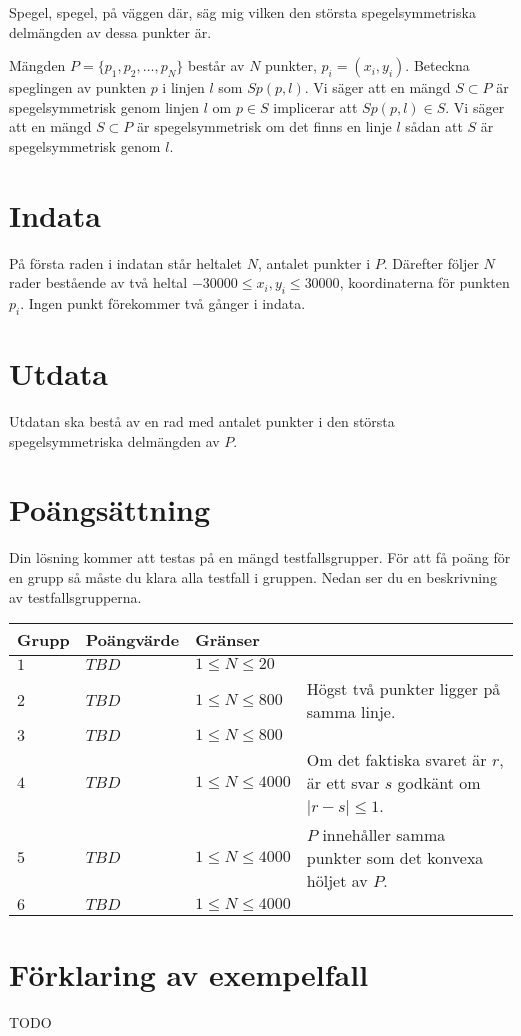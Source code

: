 

\noindent
Spegel, spegel, på väggen där, säg mig vilken den största spegelsymmetriska delmängden av dessa punkter är.

\noindent
Mängden $P = \{p_1, p_2, \dots, p_N\}$ består av $N$ punkter, $p_i = (x_i, y_i)$. Beteckna speglingen av punkten $p$ i linjen $l$ som $Sp(p, l)$. Vi säger att en mängd $S \subset P$ är spegelsymmetrisk genom linjen $l$ om $p \in S$ implicerar att $Sp(p, l) \in S$. Vi säger att en mängd $S \subset P$ är spegelsymmetrisk om det finns en linje $l$ sådan att $S$ är spegelsymmetrisk genom $l$.

\section*{Indata}
På första raden i indatan står heltalet $N$, antalet punkter i $P$. Därefter följer $N$ rader bestående av två heltal $-30000 \leq x_i, y_i \leq 30000$, koordinaterna för punkten $p_i$. Ingen punkt förekommer två gånger i indata.

\section*{Utdata}
Utdatan ska bestå av en rad med antalet punkter i den största spegelsymmetriska delmängden av $P$.

\section*{Poängsättning}
Din lösning kommer att testas på en mängd testfallsgrupper.
För att få poäng för en grupp så måste du klara alla testfall i gruppen.
Nedan ser du en beskrivning av testfallsgrupperna.

\noindent
\begin{tabular}{| l | l | l | l |}
\hline
Grupp & Poängvärde & Gränser \\ \hline
$1$    & $TBD$         & $1 \leq N \leq 20$ & \\ \hline
$2$    & $TBD$         & $1 \leq N \leq 800$ & Högst två punkter ligger på samma linje.\\ \hline
$3$    & $TBD$         & $1 \leq N \leq 800$ & \\ \hline
$4$    & $TBD$         & $1 \leq N \leq 4000$ & Om det faktiska svaret är $r$, är ett svar $s$ godkänt om $|r-s| \leq 1$.\\ \hline
$5$    & $TBD$         & $1 \leq N \leq 4000$ & $P$ innehåller samma punkter som det konvexa höljet av $P$.\\ \hline
$6$    & $TBD$         & $1 \leq N \leq 4000$ & \\ \hline
\end{tabular}

\section*{Förklaring av exempelfall}
TODO
